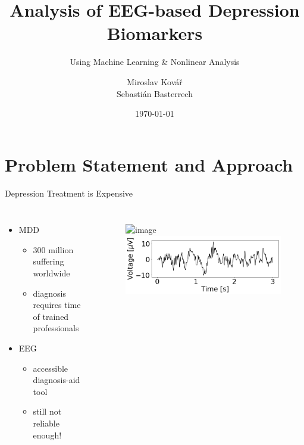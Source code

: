 \documentclass{beamer}
\title{Analysis of EEG-based Depression Biomarkers}
\subtitle{Using Machine Learning \& Nonlinear Analysis}
\author{Miroslav Kovář\\[1mm]\small{Sebastián Basterrech}}
\institute{FJFI}
\date{\today}
\begin{document}

\begin{frame}
	\maketitle %
\end{frame}


\section{Problem Statement and Approach} 
\begin{frame}{Depression Treatment is Expensive}
	\begin{columns}
        \begin{itemize}
          \item MDD
            \begin{itemize}
              \item<2-> 300 million suffering worldwide %
              \item<3-> diagnosis requires time of trained professionals %
            \end{itemize}
          \item EEG 
            \begin{itemize}
              \item<4-> accessible diagnosis-aid tool %
              \item<5-> still not reliable enough! 
            \end{itemize}
        \end{itemize}
        \vfill
            \begin{figure}
                \includegraphics<1->[width=0.9\linewidth]{./Images/electrodes.png}
                \\
                \includegraphics[width=\linewidth]{./Images/signal.png}
            \end{figure}
	\end{columns}
\end{frame}
\end{document}

